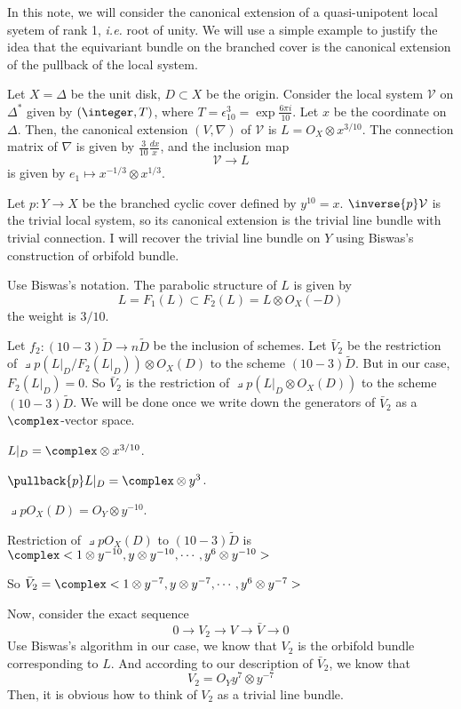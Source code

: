\documentclass{article}
\begin{document}
In this note, we will consider the canonical extension of a
quasi-unipotent local syetem of rank 1, \emph{i.e.} root of unity.
We will use a simple example to justify the idea that the equivariant bundle
on the branched cover is the canonical extension of the pullback of the local system.

\newcommand{\V}{\mathcal{V}}
Let $X = \Delta$ be the unit disk, $D \subset X$ be the origin.
Consider the local system $\V$ on $\Delta^*$ given by $(\integer, T)$, where 
$T = \epsilon^3_{10} = \exp{\frac{6\pi i}{10}}$. Let $x$ be the coordinate on $\Delta$.
Then, the canonical extension $(V, \nabla)$ of $\V$ is $L = O_X\otimes x^{3/10}$. 
The connection matrix of $\nabla$ is given by $\frac{3}{10}\frac{dx}{x}$, 
and the inclusion map 
\[
    \V \rightarrow L
\]
is given by $e_1 \mapsto x^{-1/3}\otimes x^{1/3}$.

Let $p: Y \rightarrow X$ be the branched cyclic cover defined by $y^10 = x$.
$\inverse{p}\V$ is the trivial local system, so its canonical extension is the
trivial line bundle with trivial connection. I will recover the trivial line bundle
on $Y$ using Biswas's construction of orbifold bundle. 

Use Biswas's notation. The parabolic structure of $L$ is given by
\[
    L = F_1(L) \subset F_2(L) = L\otimes O_X(-D)
\]
the weight is $3/10$. 

\newcommand{\tD}{\tilde{D}}
Let $f_2 : (10 - 3)\tD \rightarrow n\tD$ be the inclusion of schemes. 
Let $\bar{V}_2$ be the restriction of $\pullback{p}(L|_D/F_2(L|_D))\otimes O_X(D)$ to the 
scheme $(10 - 3)\tD$.
But in our case, $F_2(L|_D) = 0$. So $\bar{V}_2$ is the restriction of 
$\pullback{p}(L|_D\otimes O_X(D))$ to the scheme $(10 - 3)\tD$. We will be done once
we write down the generators of $\bar{V}_2$ as a $\complex$-vector space.

$L|_D = \complex\otimes x^{3/10}$.

$\pullback{p}L|_D = \complex\otimes y^3$.

$\pullback{p}O_X(D) = O_Y\otimes y^{-10}$.

Restriction of $\pullback{p}O_X(D)$ to $(10 - 3)\tD$ is
$\complex<1\otimes y^{-10}, y\otimes y^{-10}, \cdots, y^6\otimes y^{-10}>$
 
So $\bar{V}_2 = \complex<1\otimes y^{-7}, y\otimes y^{-7}, \cdots, y^6\otimes y^{-7}>$

Now, consider the exact sequence
\[
    0 \rightarrow V_2 \rightarrow V \rightarrow \bar{V} \rightarrow 0 
\]
Use Biswas's algorithm in our case, we know that $V_2$ is the orbifold bundle corresponding
to $L$. And according to our description of $\bar{V}_2$, we know that
\[
    V_2 = O_Y y^7\otimes y^{-7}
\]
Then, it is obvious how to think of $V_2$ as a trivial line bundle.
\end{document}
